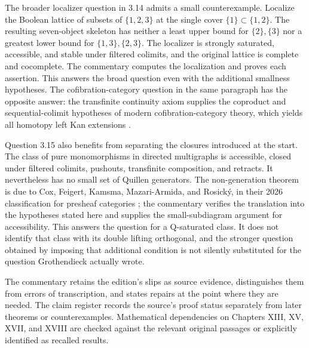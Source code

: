 The broader localizer question in 3.14 admits a small counterexample.
Localize the Boolean lattice of subsets of $\{1,2,3\}$ at the single cover
$\{1\}\subset\{1,2\}$. The resulting seven-object skeleton has neither
a least upper bound for $\{2\},\{3\}$ nor a greatest lower bound for
$\{1,3\},\{2,3\}$. The localizer is strongly saturated, accessible, and
stable under filtered colimits, and the original lattice is complete and
cocomplete. The commentary computes the localization and proves each
assertion. This answers the broad question even with the additional
smallness hypotheses. The cofibration-category question in the same
paragraph has the opposite answer: the transfinite continuity axiom
supplies the coproduct and sequential-colimit hypotheses of modern
cofibration-category theory, which yields all homotopy left Kan
extensions \citep[Theorem 10.3.2]{RadulescuBanu2009}.

Question 3.15 also benefits from separating the closures introduced at the
start. The class of pure monomorphisms in directed multigraphs is accessible,
closed under filtered colimits, pushouts, transfinite composition, and
retracts. It nevertheless has no small set of Quillen generators. The
non-generation theorem is due to Cox, Feigert, Kamsma, Mazari-Armida, and
Rosick\'y, in their 2026 classification for presheaf categories
\citep[Theorem 5.1]{CoxEtAl2026Pure}; the
commentary verifies the translation into the hypotheses stated here and
supplies the small-subdiagram argument for accessibility. This answers the
question for a Q-saturated class. It does not identify that class with its
double lifting orthogonal, and the stronger question obtained by imposing
that additional condition is not silently substituted for the question
Grothendieck actually wrote.

\medskip
The commentary retains the edition's slips as source evidence, distinguishes
them from errors of transcription, and states repairs at the
point where they are needed. The claim register records the source's proof
status separately from later theorems or counterexamples. Mathematical
dependencies on Chapters XIII, XV, XVII, and XVIII are checked against
the relevant original passages or explicitly identified as recalled results.
\nocite{*}
\endgroup
